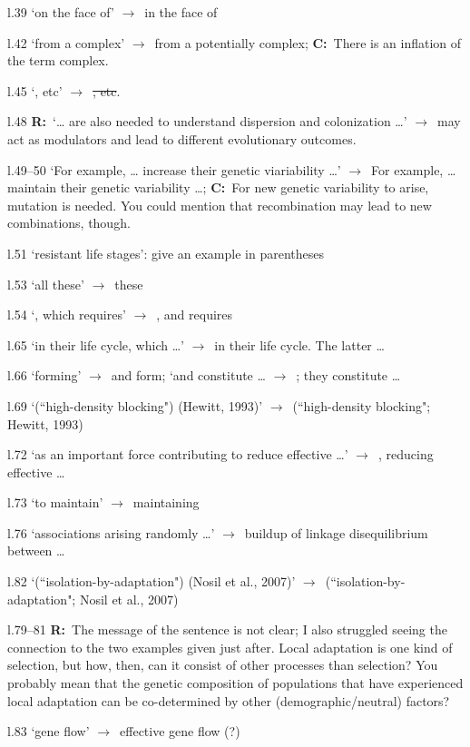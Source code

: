 \documentclass[11pt]{article}
\newenvironment{my_description}
{\begin{description}
  \setlength{\itemsep}{2pt}
  \setlength{\parskip}{0pt}
  \setlength{\parsep}{0pt}}
{\end{description}}
\newcommand{\ra}{$\rightarrow$\ }
\newcommand{\C}{\textbf{C:}\ }
\newcommand{\R}{\textbf{R:}\ }
\begin{document}
\begin{my_description}
	\item[l.39] `on the face of' \ra in the face of
	\item[l.42] `from a complex' \ra from a potentially complex; \C There is an inflation of the term complex.
	\item[l.45] `, etc' \ra \sout{, etc}.
	\item[l.48] \R `\dots{} are also needed to understand dispersion and colonization \ldots{}' \ra may act as modulators and lead to different evolutionary outcomes.
	\item[l.49--50] `For example, \ldots{} increase their genetic viariability \ldots{}' \ra For example, \ldots{} maintain their genetic variability \ldots{}; \C For new genetic variability to arise, mutation is needed. You could mention that recombination may lead to new combinations, though.
	\item[l.51] `resistant life stages': give an example in parentheses
	\item[l.53] `all these' \ra these
	\item[l.54] `, which requires' \ra , and requires
	\item[l.65] `in their life cycle, which \ldots' \ra in their life cycle. The latter \ldots
	\item[l.66] `forming' \ra and form; `and constitute \ldots{} \ra ; they constitute \ldots{}
	\item[l.69] `(``high-density blocking") (Hewitt, 1993)' \ra (``high-density blocking"; Hewitt, 1993)
	\item[l.72] `as an important force contributing to reduce effective \ldots{}' \ra , reducing effective \ldots{}
	\item[l.73] `to maintain' \ra maintaining
	\item[l.76] `associations arising randomly \ldots{}' \ra buildup of linkage disequilibrium between \ldots{}
	\item[l.82] `(``isolation-by-adaptation") (Nosil et al., 2007)' \ra (``isolation-by-adaptation"; Nosil et al., 2007)
	\item[l.79--81] \R The message of the sentence is not clear; I also struggled seeing the connection to the two examples given just after. Local adaptation is one kind of selection, but how, then, can it consist of other processes than selection? You probably mean that the genetic composition of populations that have experienced local adaptation can be co-determined by other (demographic/neutral) factors?
	\item[l.83] `gene flow' \ra effective gene flow (?)

\end{my_description}
\end{document}

